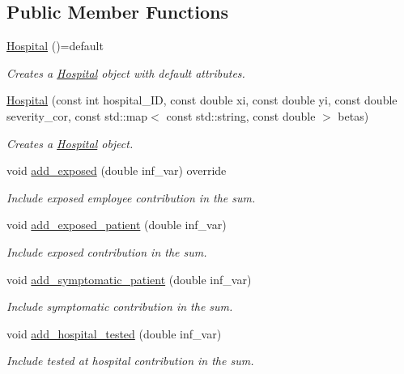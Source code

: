 \subsection*{Public Member Functions}
\begin{DoxyCompactItemize}
\item 
\hyperlink{classHospital_ae76395fdb36d01f526cb962a13784fbd}{Hospital} ()=default
\begin{DoxyCompactList}\small\item\em Creates a \hyperlink{classHospital}{Hospital} object with default attributes. \end{DoxyCompactList}\item 
\hyperlink{classHospital_a9f0f34e37e3877d717e10e7e41af21f7}{Hospital} (const int hospital\+\_\+\+ID, const double xi, const double yi, const double severity\+\_\+cor, const std\+::map$<$ const std\+::string, const double $>$ betas)
\begin{DoxyCompactList}\small\item\em Creates a \hyperlink{classHospital}{Hospital} object. \end{DoxyCompactList}\item 
void \hyperlink{classHospital_a55c2f778b4aeb0f775bb1b45c147c7b8}{add\+\_\+exposed} (double inf\+\_\+var) override
\begin{DoxyCompactList}\small\item\em Include exposed employee contribution in the sum. \end{DoxyCompactList}\item 
void \hyperlink{classHospital_a68dc4af05fc1fbca3d5c48c835e8eb72}{add\+\_\+exposed\+\_\+patient} (double inf\+\_\+var)
\begin{DoxyCompactList}\small\item\em Include exposed contribution in the sum. \end{DoxyCompactList}\item 
void \hyperlink{classHospital_aa33d0902fa7c16cb04e0652cadfcd946}{add\+\_\+symptomatic\+\_\+patient} (double inf\+\_\+var)
\begin{DoxyCompactList}\small\item\em Include symptomatic contribution in the sum. \end{DoxyCompactList}\item 
void \hyperlink{classHospital_a501b5ff208e5cb612966f9200c6f359e}{add\+\_\+hospital\+\_\+tested} (double inf\+\_\+var)
\begin{DoxyCompactList}\small\item\em Include tested at hospital contribution in the sum. \end{DoxyCompactList}\item 

\end{DoxyCompactItemize}
